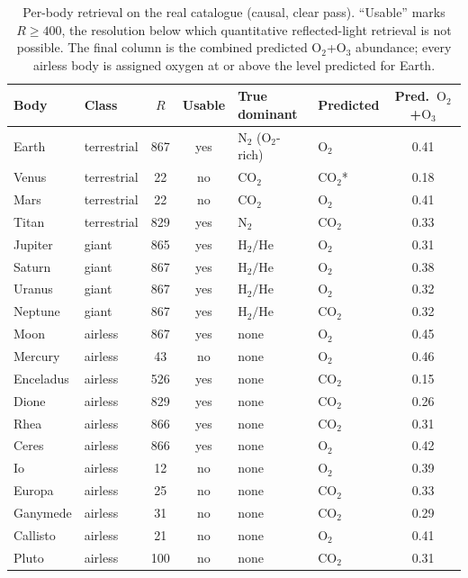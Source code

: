 \documentclass[11pt,twocolumn]{article}
\newcommand{\co}{$\mathrm{CO_2}$}
\newcommand{\ot}{$\mathrm{O_2}$}
\newcommand{\oth}{$\mathrm{O_3}$}
\newcommand{\ntwo}{$\mathrm{N_2}$}
\begin{document}
\begin{table}[t]
\centering
\caption{Per-body retrieval on the real catalogue (causal, clear pass). ``Usable''
marks $R\!\ge\!400$, the resolution below which quantitative reflected-light
retrieval is not possible. The final column is the combined predicted
\ot{}+\oth{} abundance; every airless body is assigned oxygen at or above the
level predicted for Earth.}
\label{tab:perbody}
\small
\begin{tabular}{@{}llccll c@{}}
\toprule
Body & Class & $R$ & Usable & True dominant & Predicted & Pred.\ \ot{}+\oth{} \\
\midrule
Earth     & terrestrial & 867 & yes & \ntwo{} (\ot-rich) & \ot & 0.41 \\
Venus     & terrestrial & 22  & no  & \co & \co* & 0.18 \\
Mars      & terrestrial & 22  & no  & \co & \ot & 0.41 \\
Titan     & terrestrial & 829 & yes & \ntwo & \co & 0.33 \\
Jupiter   & giant       & 865 & yes & $\mathrm{H_2/He}$ & \ot & 0.31 \\
Saturn    & giant       & 867 & yes & $\mathrm{H_2/He}$ & \ot & 0.38 \\
Uranus    & giant       & 867 & yes & $\mathrm{H_2/He}$ & \ot & 0.32 \\
Neptune   & giant       & 867 & yes & $\mathrm{H_2/He}$ & \co & 0.32 \\
Moon      & airless     & 867 & yes & none & \ot & 0.45 \\
Mercury   & airless     & 43  & no  & none & \ot & 0.46 \\
Enceladus & airless     & 526 & yes & none & \co & 0.15 \\
Dione     & airless     & 829 & yes & none & \co & 0.26 \\
Rhea      & airless     & 866 & yes & none & \co & 0.31 \\
Ceres     & airless     & 866 & yes & none & \ot & 0.42 \\
Io        & airless     & 12  & no  & none & \ot & 0.39 \\
Europa    & airless     & 25  & no  & none & \co & 0.33 \\
Ganymede  & airless     & 31  & no  & none & \co & 0.29 \\
Callisto  & airless     & 21  & no  & none & \ot & 0.41 \\
Pluto     & airless     & 100 & no  & none & \co & 0.31 \\
\bottomrule
\end{tabular}
\end{table}
\end{document}
